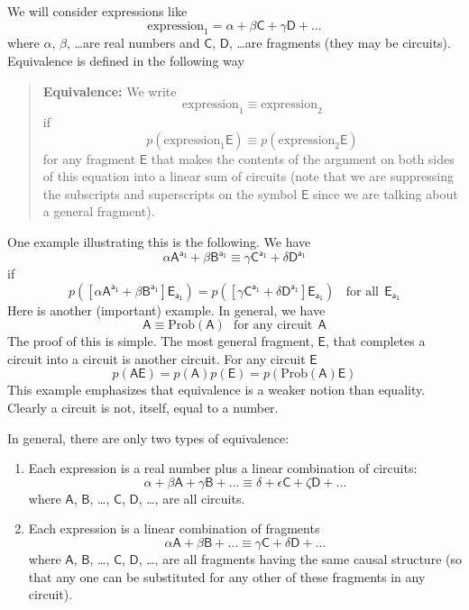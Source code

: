 \documentclass[10pt]{article}
\begin{document}
We will consider expressions like
\[
\text{expression}_1= \alpha+ \beta\mathsf{C}+\gamma\mathsf{D}+\dots
\]
where $\alpha$, $\beta$, \dots are real numbers and $\mathsf{C}$, $\mathsf{D}$, \dots are fragments (they may be circuits).   Equivalence is defined in the following way
\begin{quote}
{\bf Equivalence:}  We write
\[
\text{expression}_1 \equiv \text{expression}_2
\]
if
\[
p(\text{expression}_1 \mathsf{E}) \equiv p(\text{expression}_2 \mathsf{E})
\]
for any fragment $\mathsf E$ that makes the contents of the argument on both sides of this equation into a linear sum of circuits (note that we are suppressing the subscripts and superscripts on the symbol $\mathsf E$ since we are talking about a general fragment).
\end{quote}
One example illustrating this is the following.  We have
\[
\mathsf{ \alpha A^{a_1} + \beta B^{a_1}  \equiv \gamma C^{a_1} +\delta D^{a_1} }
\]
if
\[
p(\mathsf{ [\alpha A^{a_1} + \beta B^{a_1}] E_{a_1} })  = p(\mathsf{[\gamma C^{a_1} +\delta D^{a_1}] E_{a_1} })  ~~~~\text{for all} ~~\mathsf{ E_{a_1}}
\]
Here is another (important) example.  In general, we have
\begin{equation}\label{probAequivA}
\mathsf{ A} \equiv \text{Prob}(\mathsf{A}) ~~~ \text{for any circuit} ~~ \mathsf{A}
\end{equation}
The proof of this is simple.  The most general fragment, $\mathsf E$, that completes a circuit into a circuit is another circuit.  For any circuit $\mathsf E$
\[ p(\mathsf{ A E} ) = p(\mathsf{A})p(\mathsf{E}) = p(\text{Prob}(\mathsf{A}) \mathsf{E}) \]
This example emphasizes that equivalence is a weaker notion than equality.  Clearly a circuit is not, itself, equal to a number.

In general, there are only two types of equivalence:
\begin{enumerate}
\item Each expression is a real number plus a linear combination of circuits:
\[
\alpha + \beta\mathsf{A} + \gamma \mathsf{B} + \dots \equiv \delta + \epsilon \mathsf{ C}+ \zeta \mathsf{D} + \dots
\]
where $\mathsf{A}$, $\mathsf B$, \dots, $\mathsf C$, $\mathsf D$, \dots, are all circuits.
\item Each expression is a linear combination of fragments
\[
\alpha\mathsf{A} + \beta \mathsf{B} + \dots \equiv \gamma\mathsf{ C}+ \delta \mathsf{D} + \dots
\]
where $\mathsf{A}$, $\mathsf B$, \dots, $\mathsf C$, $\mathsf D$, \dots, are all fragments having the same causal structure (so that any one can be substituted for any other of these fragments in any circuit).
\end{enumerate}
\end{document}
